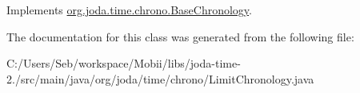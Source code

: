 Implements \hyperlink{classorg_1_1joda_1_1time_1_1chrono_1_1_base_chronology_a63d48bcfe7b36b349c8afb8289b94b0b}{org.\-joda.\-time.\-chrono.\-Base\-Chronology}.



The documentation for this class was generated from the following file\-:\begin{DoxyCompactItemize}
\item 
C\-:/\-Users/\-Seb/workspace/\-Mobii/libs/joda-\/time-\/2./src/main/java/org/joda/time/chrono/Limit\-Chronology.\-java\end{DoxyCompactItemize}
